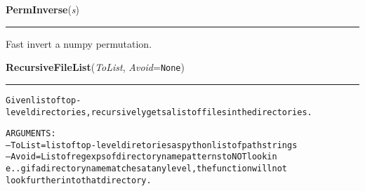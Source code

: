     \label{System:Utils:PermInverse}

    \vspace{0.5ex}

\hspace{.8\funcindent}\begin{boxedminipage}{\funcwidth}

    \raggedright \textbf{PermInverse}(\textit{s})

    \vspace{-1.5ex}

    \rule{\textwidth}{0.5\fboxrule}
\setlength{\parskip}{2ex}
    Fast invert a numpy permutation.

\setlength{\parskip}{1ex}
    \end{boxedminipage}

    \label{System:Utils:RecursiveFileList}

    \vspace{0.5ex}

\hspace{.8\funcindent}\begin{boxedminipage}{\funcwidth}

    \raggedright \textbf{RecursiveFileList}(\textit{ToList}, \textit{Avoid}={\tt None})

    \vspace{-1.5ex}

    \rule{\textwidth}{0.5\fboxrule}
\setlength{\parskip}{2ex}
\begin{alltt}

Given list of top-level directories, recursively gets a list of files in the directories. 

ARGUMENTS:
--ToList = list of top-level diretories as python list of path strings
--Avoid = List of regexps of directory name patterns to NOT look in 
        e..g if a directory name matches at any level, the function will not 
        look further into that directory. 
\end{alltt}

\setlength{\parskip}{1ex}
    \end{boxedminipage}

    \label{System:Utils:Max}


